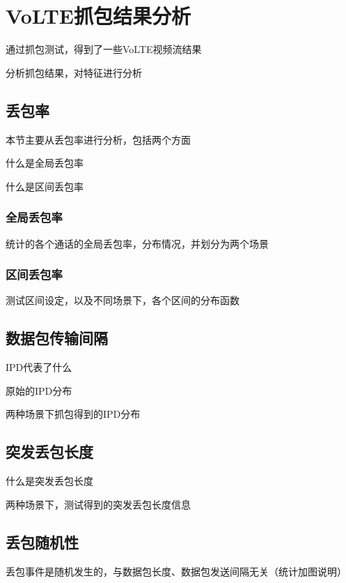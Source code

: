 \section{VoLTE抓包结果分析}
\label{chap:analyze:results}

通过抓包测试，得到了一些VoLTE视频流结果

分析抓包结果，对特征进行分析

\subsection{丢包率}
\label{chap:analyze:results:plr}

本节主要从丢包率进行分析，包括两个方面

什么是全局丢包率

什么是区间丢包率

\subsubsection{全局丢包率}
\label{chap:analyze:results:plr:global}

统计的各个通话的全局丢包率，分布情况，并划分为两个场景

\subsubsection{区间丢包率}
\label{chap:analyze:results:plr:window}

测试区间设定，以及不同场景下，各个区间的分布函数

\subsection{数据包传输间隔}
\label{chap:analyze:results:ipd}

IPD代表了什么

原始的IPD分布

两种场景下抓包得到的IPD分布

\subsection{突发丢包长度}
\label{chap:analyze:results:burst}

什么是突发丢包长度

两种场景下，测试得到的突发丢包长度信息

\subsection{丢包随机性}
\label{chap:analyze:results:randomness}

丢包事件是随机发生的，与数据包长度、数据包发送间隔无关（统计加图说明）
